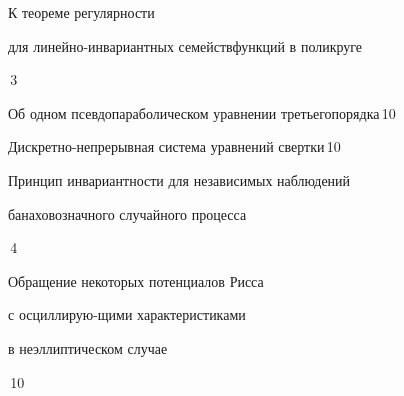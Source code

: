 

{К теореме регулярности 


для линейно-инвариантных семейств\newline функций в поликруге}{\No\,3}




{Об одном псевдопараболическом уравнении третьего\newline порядка}{\No\,10}




{Дискретно-непрерывная система уравнений свертки}{\No\,10}




{Принцип инвариантности для независимых наблюдений\newline


банаховозначного случайного процесса}{\No\,4}




{Обращение некоторых потенциалов Рисса 


с осциллирую-\newline щими характеристиками 


в неэллиптическом случае}{\No\,10}



















\bigskip



















